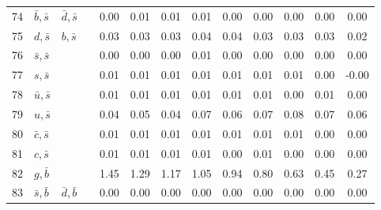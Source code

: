 \begin{tabularx}{\textwidth}{rXXX@{}S@{}S@{}S@{}S@{}S@{}S@{}S@{}S@{}S}
 74 & $\bar b, \bar s$ & $\bar d, \bar s$  &                  &  0.00 &  0.01 &  0.01 &  0.01 &  0.00 &  0.00 &  0.00 &  0.00 &  0.00 \\
 75 & $d, \bar s$      & $b, \bar s$       &                  &  0.03 &  0.03 &  0.03 &  0.04 &  0.04 &  0.03 &  0.03 &  0.03 &  0.02 \\
 76 & $\bar s, \bar s$ &                   &                  &  0.00 &  0.00 &  0.00 &  0.01 &  0.00 &  0.00 &  0.00 &  0.00 &  0.00 \\
 77 & $s, \bar s$      &                   &                  &  0.01 &  0.01 &  0.01 &  0.01 &  0.01 &  0.01 &  0.01 &  0.00 & -0.00 \\
 78 & $\bar u, \bar s$ &                   &                  &  0.01 &  0.01 &  0.01 &  0.01 &  0.01 &  0.01 &  0.00 &  0.01 &  0.00 \\
 79 & $u, \bar s$      &                   &                  &  0.04 &  0.05 &  0.04 &  0.07 &  0.06 &  0.07 &  0.08 &  0.07 &  0.06 \\
 80 & $\bar c, \bar s$ &                   &                  &  0.01 &  0.01 &  0.01 &  0.01 &  0.01 &  0.01 &  0.01 &  0.00 &  0.00 \\
 81 & $c, \bar s$      &                   &                  &  0.01 &  0.01 &  0.01 &  0.01 &  0.00 &  0.01 &  0.00 &  0.00 &  0.00 \\
 82 & $g, \bar b$      &                   &                  &  1.45 &  1.29 &  1.17 &  1.05 &  0.94 &  0.80 &  0.63 &  0.45 &  0.27 \\
 83 & $\bar s, \bar b$ & $\bar d, \bar b$  &                  &  0.00 &  0.00 &  0.00 &  0.00 &  0.00 &  0.00 &  0.00 &  0.00 &  0.00 \\
\bottomrule
\end{tabularx}
